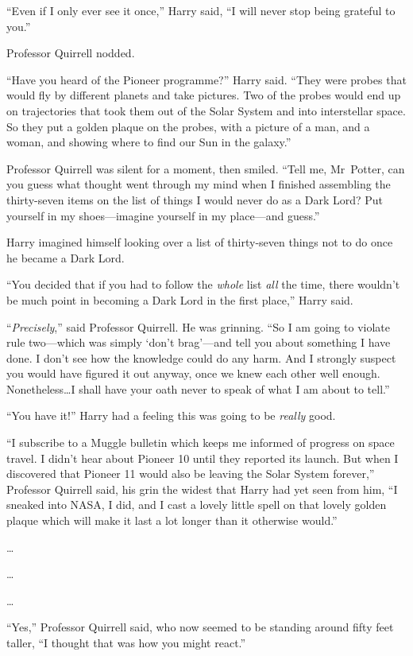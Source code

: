 “Even if I only ever see it once,” Harry said,
“I will never stop being grateful to you.”

Professor Quirrell nodded.

“Have you heard of the Pioneer programme?” Harry said.
“They were probes that would fly by different planets and take pictures. Two of the probes would end up on trajectories that took them out of the Solar System and into interstellar space. So they put a golden plaque on the probes, with a picture of a man, and a woman, and showing where to find our Sun in the galaxy.”

Professor Quirrell was silent for a moment, then smiled.
“Tell me, Mr~Potter, can you guess what thought went through my mind when I finished assembling the thirty-seven items on the list of things I would never do as a Dark Lord? Put yourself in my shoes—imagine yourself in my place—and guess.”

Harry imagined himself looking over a list of thirty-seven things not to do once he became a Dark Lord.

“You decided that if you had to follow the \emph{whole} list \emph{all} the time, there wouldn’t be much point in becoming a Dark Lord in the first place,” Harry said.

“\emph{Precisely},” said Professor Quirrell. He was grinning.
“So I am going to violate rule two—which was simply ‘don’t brag’—and tell you about something I have done. I don’t see how the knowledge could do any harm. And I strongly suspect you would have figured it out anyway, once we knew each other well enough. Nonetheless…I shall have your oath never to speak of what I am about to tell.”

“You have it!” Harry had a feeling this was going to be \emph{really} good.

“I subscribe to a Muggle bulletin which keeps me informed of progress on space travel. I didn’t hear about Pioneer 10 until they reported its launch. But when I discovered that Pioneer 11 would also be leaving the Solar System forever,” Professor Quirrell said, his grin the widest that Harry had yet seen from him,
“I sneaked into NASA, I did, and I cast a lovely little spell on that lovely golden plaque which will make it last a lot longer than it otherwise would.”

…

…

…

“Yes,” Professor Quirrell said, who now seemed to be standing around fifty feet taller,
“I thought that was how you might react.”

